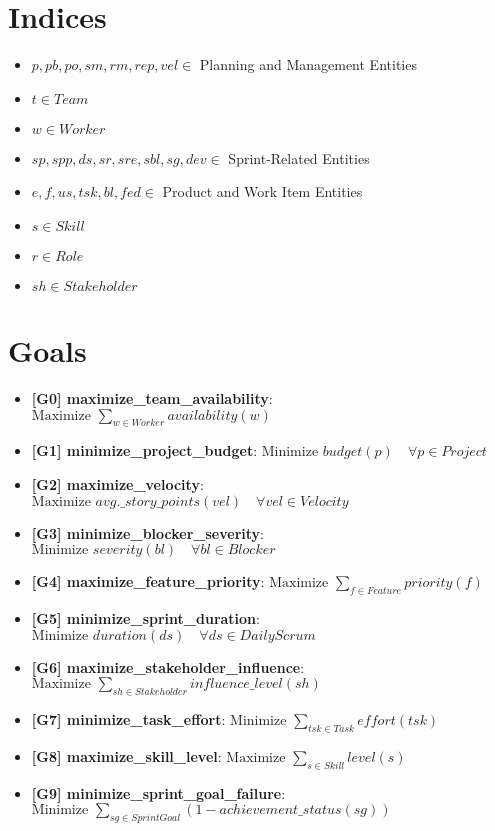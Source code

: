 \documentclass[11pt]{article}
\begin{document}
\section{Indices}
\begin{itemize}
    \item $p, pb, po, sm, rm, rep, vel \in$ Planning and Management Entities
    \item $t \in Team$
    \item $w \in Worker$
    \item $sp, spp, ds, sr, sre, sbl, sg, dev \in$ Sprint-Related Entities
    \item $e, f, us, tsk, bl, fed \in$ Product and Work Item Entities
    \item $s \in Skill$
    \item $r \in Role$
    \item $sh \in Stakeholder$
\end{itemize}

\section{Goals}
\begin{itemize}
    \item \textbf{[G0] maximize\_team\_availability}: $\text{Maximize } \sum_{w \in Worker} availability(w)$
    \item \textbf{[G1] minimize\_project\_budget}: $\text{Minimize } budget(p) \quad \forall p \in Project$
    \item \textbf{[G2] maximize\_velocity}: $\text{Maximize } avg.\_story\_points(vel) \quad \forall vel \in Velocity$
    \item \textbf{[G3] minimize\_blocker\_severity}: $\text{Minimize } severity(bl) \quad \forall bl \in Blocker$
    \item \textbf{[G4] maximize\_feature\_priority}: $\text{Maximize } \sum_{f \in Feature} priority(f)$
    \item \textbf{[G5] minimize\_sprint\_duration}: $\text{Minimize } duration(ds) \quad \forall ds \in DailyScrum$
    \item \textbf{[G6] maximize\_stakeholder\_influence}: $\text{Maximize } \sum_{sh \in Stakeholder} influence\_level(sh)$
    \item \textbf{[G7] minimize\_task\_effort}: $\text{Minimize } \sum_{tsk \in Task} effort(tsk)$
    \item \textbf{[G8] maximize\_skill\_level}: $\text{Maximize } \sum_{s \in Skill} level(s)$
    \item \textbf{[G9] minimize\_sprint\_goal\_failure}: $\text{Minimize } \sum_{sg \in SprintGoal} (1 - achievement\_status(sg))$
\end{itemize}
\end{document}
